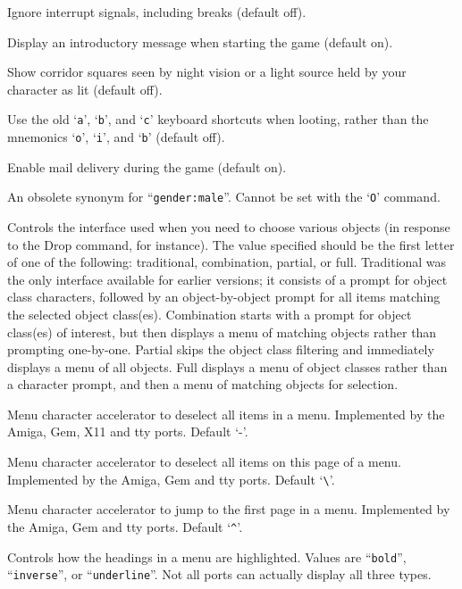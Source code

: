\item[\ib{ignintr}]
Ignore interrupt signals, including breaks (default off).
\item[\ib{legacy}]
Display an introductory message when starting the game (default on).
\item[\ib{lit\_corridor}]
Show corridor squares seen by night vision or a light source held by your
character as lit (default off).
\item[\ib{lootabc}]
Use the old `{\tt a}', `{\tt b}', and `{\tt c}' keyboard shortcuts when
looting, rather than the mnemonics `{\tt o}', `{\tt i}', and `{\tt b}' (default off).
\item[\ib{mail}]
Enable mail delivery during the game (default on).
\item[\ib{male}]
An obsolete synonym for ``{\tt gender:male}''.  Cannot be set with the
`{\tt O}' command.
\item[\ib{menustyle}]
Controls the interface used when you need to choose various objects (in
response to the Drop command, for instance).  The value specified should
be the first letter of one of the following:  traditional, combination,
partial, or full.  Traditional was the only interface available for
earlier versions; it consists of a prompt for object class characters,
followed by an object-by-object prompt for all items matching the selected
object class(es).  Combination starts with a prompt for object class(es)
of interest, but then displays a menu of matching objects rather than
prompting one-by-one.  Partial skips the object class filtering and
immediately displays a menu of all objects.  Full displays a menu of
object classes rather than a character prompt, and then a menu of matching
objects for selection.
\item[\ib{menu\_deselect\_all}]
Menu character accelerator to deselect all items in a menu.
Implemented by the Amiga, Gem, X11 and tty ports.
Default `-'.
\item[\ib{menu\_deselect\_page}]
Menu character accelerator to deselect all items on this page of a menu.
Implemented by the Amiga, Gem and tty ports.
Default `\verb+\+'.
\item[\ib{menu\_first\_page}]
Menu character accelerator to jump to the first page in a menu.
Implemented by the Amiga, Gem and tty ports.
Default `\verb+^+'.
\item[\ib{menu\_headings}]
Controls how the headings in a menu are highlighted.
Values are ``{\tt bold}'', ``{\tt inverse}'', or ``{\tt underline}''.
Not all ports can actually display all three types.
